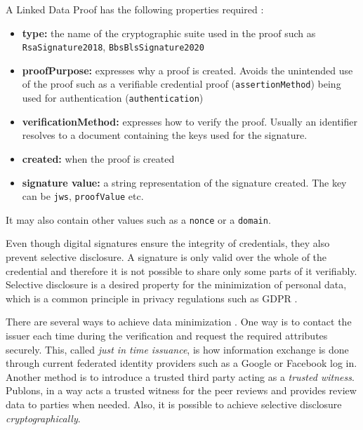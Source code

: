 A Linked Data Proof has the following properties required \parencite{ldproofs}:

\begin{itemize}
    \item \textbf{type:} the name of the cryptographic suite used in the proof such as \lstinline{RsaSignature2018}, \lstinline{BbsBlsSignature2020}
    \item \textbf{proofPurpose:} expresses why a proof is created. Avoids the unintended use of the proof such as a verifiable credential proof (\lstinline{assertionMethod}) being used for authentication (\lstinline{authentication})
    \item \textbf{verificationMethod:} expresses how to verify the proof. Usually an identifier resolves to a document containing the keys used for the signature.
    \item \textbf{created:} when the proof is created
    \item \textbf{signature value:} a string representation of the signature created. The key can be \lstinline{jws}, \lstinline{proofValue} etc.
\end{itemize}

It may also contain other values such as a \lstinline{nonce} or a \lstinline{domain}.

Even though digital signatures ensure the integrity of credentials, they also prevent selective disclosure. A signature is only valid over the whole of the credential and therefore it is not possible to share only some parts of it verifiably. Selective disclosure is a desired property for the minimization of personal data, which is a common principle in privacy regulations such as \acrshort{GDPR} \parencite{gdpr, langheinrich_2001}.

There are several ways to achieve data minimization \parencite{Helmy.8May2020}. One way is to contact the issuer each time during the verification and request the required attributes securely. This, called \textit{just in time issuance}, is how information exchange is done through current federated identity providers such as a Google or Facebook log in. Another method is to introduce a trusted third party acting as a \textit{trusted witness}. Publons, in a way acts a trusted witness for the peer reviews and provides review data to parties when needed. Also, it is possible to achieve selective disclosure \textit{cryptographically}. 

